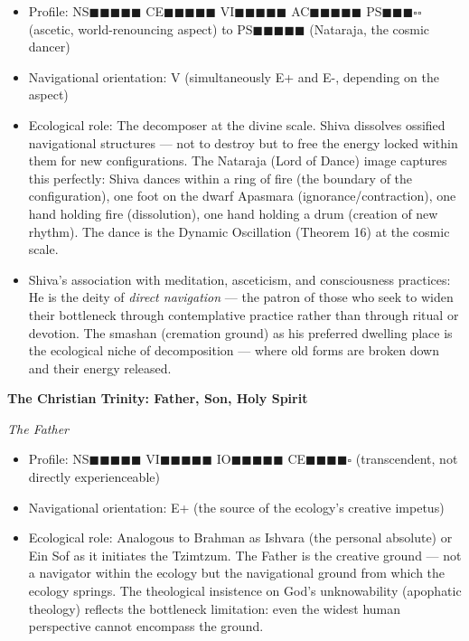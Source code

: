 \begin{itemize}[nosep,leftmargin=*]
  \item Profile: NS$\blacksquare$$\blacksquare$$\blacksquare$$\blacksquare$$\blacksquare$ CE$\blacksquare$$\blacksquare$$\blacksquare$$\blacksquare$$\blacksquare$ VI$\blacksquare$$\blacksquare$$\blacksquare$$\blacksquare$$\blacksquare$ AC$\blacksquare$$\blacksquare$$\blacksquare$$\blacksquare$$\blacksquare$ PS$\blacksquare$$\blacksquare$$\blacksquare$$\square$$\square$ (ascetic, world-renouncing aspect) to PS$\blacksquare$$\blacksquare$$\blacksquare$$\blacksquare$$\blacksquare$ (Nataraja, the cosmic dancer)
  \item Navigational orientation: V (simultaneously E+ and E-, depending on the aspect)
  \item Ecological role: The decomposer at the divine scale. Shiva dissolves ossified navigational structures — not to destroy but to free the energy locked within them for new configurations. The Nataraja (Lord of Dance) image captures this perfectly: Shiva dances within a ring of fire (the boundary of the configuration), one foot on the dwarf Apasmara (ignorance/\allowbreak contraction), one hand holding fire (dissolution), one hand holding a drum (creation of new rhythm). The dance is the Dynamic Oscillation (Theorem 16) at the cosmic scale.
  \item Shiva's association with meditation, asceticism, and consciousness practices: He is the deity of \textit{direct navigation} — the patron of those who seek to widen their bottleneck through contemplative practice rather than through ritual or devotion. The smashan (cremation ground) as his preferred dwelling place is the ecological niche of decomposition — where old forms are broken down and their energy released.
\end{itemize}


\textbf{The Christian Trinity: Father, Son, Holy Spirit}


\textit{The Father}

\begin{itemize}[nosep,leftmargin=*]
  \item Profile: NS$\blacksquare$$\blacksquare$$\blacksquare$$\blacksquare$$\blacksquare$ VI$\blacksquare$$\blacksquare$$\blacksquare$$\blacksquare$$\blacksquare$ IO$\blacksquare$$\blacksquare$$\blacksquare$$\blacksquare$$\blacksquare$ CE$\blacksquare$$\blacksquare$$\blacksquare$$\blacksquare$$\square$ (transcendent, not directly experienceable)
  \item Navigational orientation: E+ (the source of the ecology's creative impetus)
  \item Ecological role: Analogous to Brahman as Ishvara (the personal absolute) or Ein Sof as it initiates the Tzimtzum. The Father is the creative ground — not a navigator within the ecology but the navigational ground from which the ecology springs. The theological insistence on God's unknowability (apophatic theology) reflects the bottleneck limitation: even the widest human perspective cannot encompass the ground.
\end{itemize}


